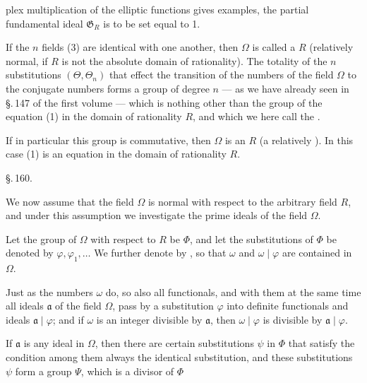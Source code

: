 plex multiplication of the elliptic functions gives examples, the
partial fundamental ideal $\mathfrak{G}_R$ is to be set equal to 1.

If the $n$ fields (3) are identical with one another, then $\Omega$ is called a
 $R$ (relatively normal, if $R$ is not the absolute
domain of rationality). The totality of the $n$ substitutions $(\Theta, \Theta_n)$
that effect the transition of the numbers of the field $\Omega$ to the conjugate
numbers forms a group of degree $n$ --- as we have already seen in \S.\,147 of the
first volume --- which is nothing other than the  group of the
equation (1) in the domain of rationality $R$, and which we here call the .

If in particular this group is commutative, then $\Omega$ is an
 $R$ (a relatively ). In this
case (1) is an  equation in the domain of rationality $R$.

\begin{center}
\S.\,160.\\[6pt]
\end{center}

We now assume that the field $\Omega$ is normal with respect to the arbitrary
field $R$, and under this assumption we investigate the prime ideals of the field
$\Omega$.

Let the group of $\Omega$ with respect to $R$ be $\Phi$, and let the substitutions
of $\Phi$ be denoted by $\varphi, \varphi_1, \ldots$ We further denote by
, so that $\omega$
and $\omega \mid \varphi$ are contained in $\Omega$.

Just as the numbers $\omega$ do, so also all functionals, and with them at the same
time all ideals $\mathfrak{a}$ of the field $\Omega$, pass by a substitution
$\varphi$ into definite functionals and ideals $\mathfrak{a} \mid \varphi$; and if
$\omega$ is an integer divisible by $\mathfrak{a}$, then $\omega \mid \varphi$ is
divisible by $\mathfrak{a} \mid \varphi$.

If $\mathfrak{a}$ is any ideal in $\Omega$, then there are certain substitutions
$\psi$ in $\Phi$ that satisfy the condition
among them always the identical substitution, and these substitutions $\psi$
form a group $\Psi$, which is a divisor of $\Phi$
